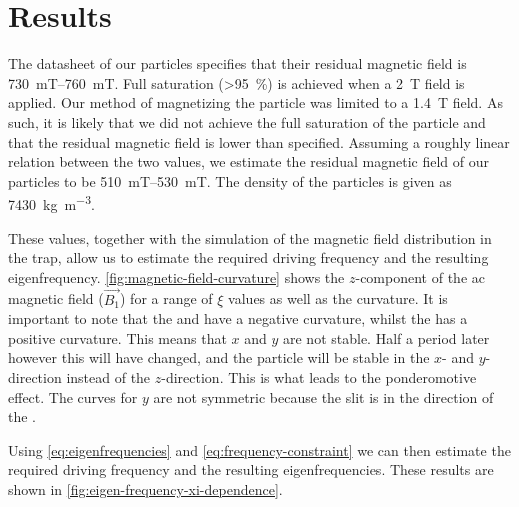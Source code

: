 \chapter{Results}
\label{chap:results}
The datasheet of our  particles specifies that their residual magnetic field is \qtyrange{730}{760}{\milli\tesla}. Full saturation (\qty{>95}{\percent}) is achieved when a \qty{2}{\tesla} field is applied\cite{magnequench}. Our method of magnetizing the particle was limited to a \qty{1.4}{\tesla} field. As such, it is likely that we did not achieve the full saturation of the particle and that the residual magnetic field is lower than specified. Assuming a roughly linear relation between the two values, we estimate the residual magnetic field of our particles to be \qtyrange{510}{530}{\milli\tesla}. The density of the particles is given as \qty{7430}{\kilo\gram\per\cubic\meter}\cite{magnequench}.

These values, together with the simulation of the magnetic field distribution in the trap, allow us to estimate the required driving frequency and the resulting eigenfrequency. \autoref{fig:magnetic-field-curvature} shows the $z$-component of the ac magnetic field ($\vec{B_1}$) for a range of $\xi$ values as well as the curvature. It is important to note that the \xmode and \ymode have a negative curvature, whilst the \zmode has a positive curvature. This means that $x$ and $y$ are not stable. Half a period later however this will have changed, and the particle will be stable in the $x$- and $y$-direction instead of the $z$-direction. This is what leads to the ponderomotive effect. The curves for $y$ are not symmetric because the slit is in the direction of the \ymode.

Using \autoref{eq:eigenfrequencies} and \autoref{eq:frequency-constraint} we can then estimate the required driving frequency and the resulting eigenfrequencies. These results are shown in \autoref{fig:eigen-frequency-xi-dependence}.

